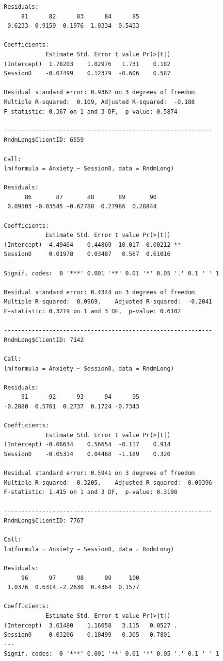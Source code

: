 \documentclass[
  english,
]{book}
\begin{document}
\begin{verbatim}
Residuals:
     81      82      83      84      85 
 0.6233 -0.9159 -0.1976  1.0334 -0.5433 

Coefficients:
            Estimate Std. Error t value Pr(>|t|)
(Intercept)  1.78203    1.02976   1.731    0.182
Session0    -0.07499    0.12379  -0.606    0.587

Residual standard error: 0.9362 on 3 degrees of freedom
Multiple R-squared:  0.109, Adjusted R-squared:  -0.188 
F-statistic: 0.367 on 1 and 3 DF,  p-value: 0.5874

------------------------------------------------------------ 
RndmLong$ClientID: 6559

Call:
lm(formula = Anxiety ~ Session0, data = RndmLong)

Residuals:
      86       87       88       89       90 
 0.09503 -0.03545 -0.62788  0.27986  0.28844 

Coefficients:
            Estimate Std. Error t value Pr(>|t|)   
(Intercept)  4.49464    0.44869  10.017  0.00212 **
Session0     0.01978    0.03487   0.567  0.61016   
---
Signif. codes:  0 '***' 0.001 '**' 0.01 '*' 0.05 '.' 0.1 ' ' 1

Residual standard error: 0.4344 on 3 degrees of freedom
Multiple R-squared:  0.0969,    Adjusted R-squared:  -0.2041 
F-statistic: 0.3219 on 1 and 3 DF,  p-value: 0.6102

------------------------------------------------------------ 
RndmLong$ClientID: 7142

Call:
lm(formula = Anxiety ~ Session0, data = RndmLong)

Residuals:
     91      92      93      94      95 
-0.2880  0.5761  0.2737  0.1724 -0.7343 

Coefficients:
            Estimate Std. Error t value Pr(>|t|)
(Intercept) -0.06634    0.56654  -0.117    0.914
Session0    -0.05314    0.04468  -1.189    0.320

Residual standard error: 0.5941 on 3 degrees of freedom
Multiple R-squared:  0.3205,    Adjusted R-squared:  0.09396 
F-statistic: 1.415 on 1 and 3 DF,  p-value: 0.3198

------------------------------------------------------------ 
RndmLong$ClientID: 7767

Call:
lm(formula = Anxiety ~ Session0, data = RndmLong)

Residuals:
     96      97      98      99     100 
 1.0376  0.6314 -2.2630  0.4364  0.1577 

Coefficients:
            Estimate Std. Error t value Pr(>|t|)  
(Intercept)  3.61480    1.16058   3.115   0.0527 .
Session0    -0.03206    0.10499  -0.305   0.7801  
---
Signif. codes:  0 '***' 0.001 '**' 0.01 '*' 0.05 '.' 0.1 ' ' 1


\end{verbatim}
\end{document}

